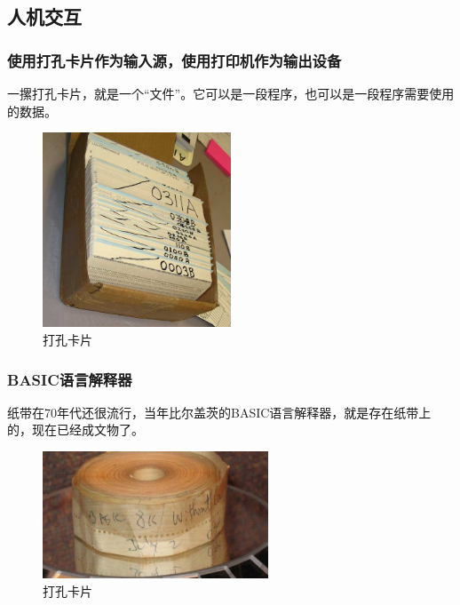 \subsection{人机交互}

\subsubsection{使用打孔卡片作为输入源，使用打印机作为输出设备}

一摞打孔卡片，就是一个“文件”。它可以是一段程序，也可以是一段程序需要使用的数据。

\begin{figure}[htb]
\centering
\includegraphics[width=0.5\textwidth]{images/Terminal-application-programming/fig-old-computer-input.jpg}
\caption{打孔卡片}
\label{fig:old-computer-input}
\end{figure}

\subsubsection{BASIC语言解释器}

纸带在70年代还很流行，当年比尔盖茨的BASIC语言解释器，就是存在纸带上的，现在已经成文物了。

\begin{figure}[htb]
\centering
\includegraphics[width=0.6\textwidth]{images/Terminal-application-programming/fig-basic-lang-punch-tape.jpg}
\caption{打孔卡片}
\label{fig:basic-lang-punch-tape}
\end{figure}

